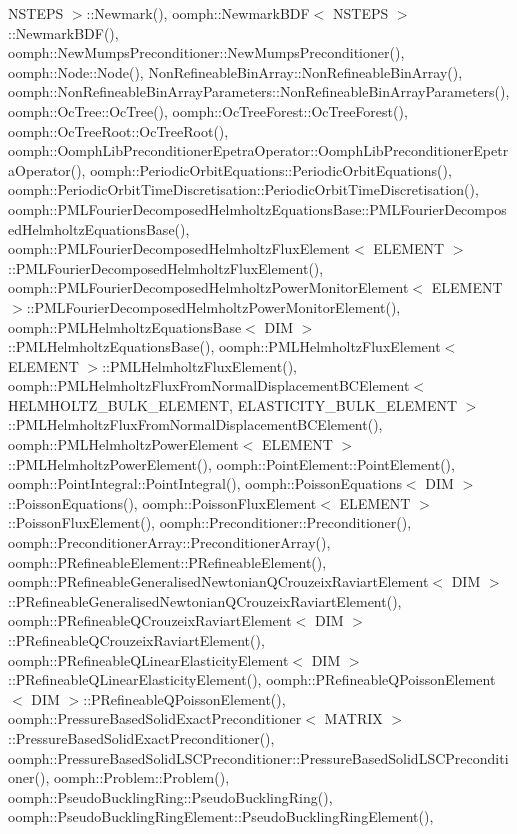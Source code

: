N\+S\+T\+E\+P\+S $>$\+::\+Newmark(), oomph\+::\+Newmark\+B\+D\+F$<$ N\+S\+T\+E\+P\+S $>$\+::\+Newmark\+B\+D\+F(), oomph\+::\+New\+Mumps\+Preconditioner\+::\+New\+Mumps\+Preconditioner(), oomph\+::\+Node\+::\+Node(), Non\+Refineable\+Bin\+Array\+::\+Non\+Refineable\+Bin\+Array(), oomph\+::\+Non\+Refineable\+Bin\+Array\+Parameters\+::\+Non\+Refineable\+Bin\+Array\+Parameters(), oomph\+::\+Oc\+Tree\+::\+Oc\+Tree(), oomph\+::\+Oc\+Tree\+Forest\+::\+Oc\+Tree\+Forest(), oomph\+::\+Oc\+Tree\+Root\+::\+Oc\+Tree\+Root(), oomph\+::\+Oomph\+Lib\+Preconditioner\+Epetra\+Operator\+::\+Oomph\+Lib\+Preconditioner\+Epetra\+Operator(), oomph\+::\+Periodic\+Orbit\+Equations\+::\+Periodic\+Orbit\+Equations(), oomph\+::\+Periodic\+Orbit\+Time\+Discretisation\+::\+Periodic\+Orbit\+Time\+Discretisation(), oomph\+::\+P\+M\+L\+Fourier\+Decomposed\+Helmholtz\+Equations\+Base\+::\+P\+M\+L\+Fourier\+Decomposed\+Helmholtz\+Equations\+Base(), oomph\+::\+P\+M\+L\+Fourier\+Decomposed\+Helmholtz\+Flux\+Element$<$ E\+L\+E\+M\+E\+N\+T $>$\+::\+P\+M\+L\+Fourier\+Decomposed\+Helmholtz\+Flux\+Element(), oomph\+::\+P\+M\+L\+Fourier\+Decomposed\+Helmholtz\+Power\+Monitor\+Element$<$ E\+L\+E\+M\+E\+N\+T $>$\+::\+P\+M\+L\+Fourier\+Decomposed\+Helmholtz\+Power\+Monitor\+Element(), oomph\+::\+P\+M\+L\+Helmholtz\+Equations\+Base$<$ D\+I\+M $>$\+::\+P\+M\+L\+Helmholtz\+Equations\+Base(), oomph\+::\+P\+M\+L\+Helmholtz\+Flux\+Element$<$ E\+L\+E\+M\+E\+N\+T $>$\+::\+P\+M\+L\+Helmholtz\+Flux\+Element(), oomph\+::\+P\+M\+L\+Helmholtz\+Flux\+From\+Normal\+Displacement\+B\+C\+Element$<$ H\+E\+L\+M\+H\+O\+L\+T\+Z\+\_\+\+B\+U\+L\+K\+\_\+\+E\+L\+E\+M\+E\+N\+T, E\+L\+A\+S\+T\+I\+C\+I\+T\+Y\+\_\+\+B\+U\+L\+K\+\_\+\+E\+L\+E\+M\+E\+N\+T $>$\+::\+P\+M\+L\+Helmholtz\+Flux\+From\+Normal\+Displacement\+B\+C\+Element(), oomph\+::\+P\+M\+L\+Helmholtz\+Power\+Element$<$ E\+L\+E\+M\+E\+N\+T $>$\+::\+P\+M\+L\+Helmholtz\+Power\+Element(), oomph\+::\+Point\+Element\+::\+Point\+Element(), oomph\+::\+Point\+Integral\+::\+Point\+Integral(), oomph\+::\+Poisson\+Equations$<$ D\+I\+M $>$\+::\+Poisson\+Equations(), oomph\+::\+Poisson\+Flux\+Element$<$ E\+L\+E\+M\+E\+N\+T $>$\+::\+Poisson\+Flux\+Element(), oomph\+::\+Preconditioner\+::\+Preconditioner(), oomph\+::\+Preconditioner\+Array\+::\+Preconditioner\+Array(), oomph\+::\+P\+Refineable\+Element\+::\+P\+Refineable\+Element(), oomph\+::\+P\+Refineable\+Generalised\+Newtonian\+Q\+Crouzeix\+Raviart\+Element$<$ D\+I\+M $>$\+::\+P\+Refineable\+Generalised\+Newtonian\+Q\+Crouzeix\+Raviart\+Element(), oomph\+::\+P\+Refineable\+Q\+Crouzeix\+Raviart\+Element$<$ D\+I\+M $>$\+::\+P\+Refineable\+Q\+Crouzeix\+Raviart\+Element(), oomph\+::\+P\+Refineable\+Q\+Linear\+Elasticity\+Element$<$ D\+I\+M $>$\+::\+P\+Refineable\+Q\+Linear\+Elasticity\+Element(), oomph\+::\+P\+Refineable\+Q\+Poisson\+Element$<$ D\+I\+M $>$\+::\+P\+Refineable\+Q\+Poisson\+Element(), oomph\+::\+Pressure\+Based\+Solid\+Exact\+Preconditioner$<$ M\+A\+T\+R\+I\+X $>$\+::\+Pressure\+Based\+Solid\+Exact\+Preconditioner(), oomph\+::\+Pressure\+Based\+Solid\+L\+S\+C\+Preconditioner\+::\+Pressure\+Based\+Solid\+L\+S\+C\+Preconditioner(), oomph\+::\+Problem\+::\+Problem(), oomph\+::\+Pseudo\+Buckling\+Ring\+::\+Pseudo\+Buckling\+Ring(), oomph\+::\+Pseudo\+Buckling\+Ring\+Element\+::\+Pseudo\+Buckling\+Ring\+Element(), 